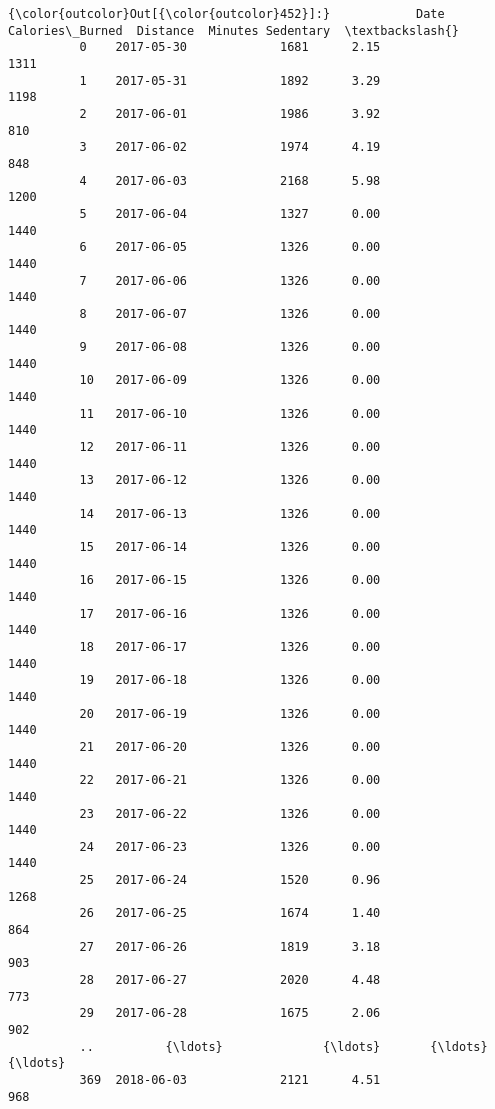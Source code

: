 \documentclass[11pt]{article}
\begin{document}
\begin{Verbatim}[commandchars=\\\{\}]
{\color{outcolor}Out[{\color{outcolor}452}]:}            Date  Calories\_Burned  Distance  Minutes Sedentary  \textbackslash{}
          0    2017-05-30             1681      2.15               1311   
          1    2017-05-31             1892      3.29               1198   
          2    2017-06-01             1986      3.92                810   
          3    2017-06-02             1974      4.19                848   
          4    2017-06-03             2168      5.98               1200   
          5    2017-06-04             1327      0.00               1440   
          6    2017-06-05             1326      0.00               1440   
          7    2017-06-06             1326      0.00               1440   
          8    2017-06-07             1326      0.00               1440   
          9    2017-06-08             1326      0.00               1440   
          10   2017-06-09             1326      0.00               1440   
          11   2017-06-10             1326      0.00               1440   
          12   2017-06-11             1326      0.00               1440   
          13   2017-06-12             1326      0.00               1440   
          14   2017-06-13             1326      0.00               1440   
          15   2017-06-14             1326      0.00               1440   
          16   2017-06-15             1326      0.00               1440   
          17   2017-06-16             1326      0.00               1440   
          18   2017-06-17             1326      0.00               1440   
          19   2017-06-18             1326      0.00               1440   
          20   2017-06-19             1326      0.00               1440   
          21   2017-06-20             1326      0.00               1440   
          22   2017-06-21             1326      0.00               1440   
          23   2017-06-22             1326      0.00               1440   
          24   2017-06-23             1326      0.00               1440   
          25   2017-06-24             1520      0.96               1268   
          26   2017-06-25             1674      1.40                864   
          27   2017-06-26             1819      3.18                903   
          28   2017-06-27             2020      4.48                773   
          29   2017-06-28             1675      2.06                902   
          ..          {\ldots}              {\ldots}       {\ldots}                {\ldots}   
          369  2018-06-03             2121      4.51                968   

\end{Verbatim}
\end{document}
